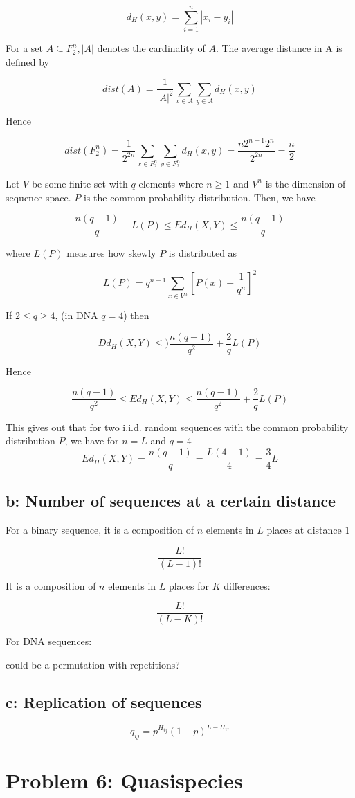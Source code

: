 \[  d_H(x,y) = \sum\limits_{i=1}^{n} | x_i -y_i |\]

For a set $A \subseteq  F^{n}_{2}, |A|$ denotes the cardinality of $A$. The average distance in A is defined by 

\begin{equation}
dist(A) = \frac{1}{|A|^2}\sum\limits_{x\in A}\sum\limits_{y\in A} d_H(x,y)
\end{equation}

Hence 

\begin{equation}
dist(F^{n}_{2}) = \frac{1}{2^{2n}}\sum\limits_{x\in F^{n}_{2}}\sum\limits_{y\in F^{n}_{2}} d_H(x,y) = \frac{n2^{n-1}2^n}{2^{2n}} = \frac{n}{2}
\end{equation}

Let $V$ be some finite set with $q$ elements where $n \geq 1$ and $V^n$ is the dimension of sequence space.  $P$ is the common probability distribution. Then, we have

\[  \frac{n(q-1)}{q} - L(P) \leq Ed_H(X,Y) \leq \frac{n(q-1)}{q} \]

where $L(P)$ measures how skewly $P$ is distributed as

\[  L(P) = q^{n-1} \sum\limits_{x \in V^n} \left[P(x)-\frac{1}{q^n}\right]^2 \]

If $ 2\leq q \geq 4$, (in DNA $q=4$) then 

\[  Dd_H(X,Y) \leq )\frac{n(q-1)}{q^2} + \frac{2}{q}L(P) \]

Hence

\[  \frac{n(q-1)}{q^2}  \leq Ed_H(X,Y) \leq \frac{n(q-1)}{q^2} + \frac{2}{q}L(P) \]

This gives out that for two i.i.d. random sequences with the common probability distribution $P$, we have for  $n = L$ and $q = 4$
\begin{equation}
Ed_H(X,Y)  = \frac{n(q-1)}{q} = \frac{L(4-1)}{4} = \frac{3}{4}L
\end{equation}


\subsection{b: Number of sequences at a certain distance}

For a binary sequence, it is a composition of $n$ elements in $L$ places at distance $1$

\[  \frac{L!}{(L-1)!} \]

It is a composition of $n$ elements in $L$ places for $K$ differences:

\[  \frac{L!}{(L-K)!} \]

For DNA sequences:


could be a permutation with repetitions?

\subsection{c: Replication of sequences}
\begin{equation}
q_{ij} = p^{H_{ij}}(1-p)^{L-H_{ij}}
\end{equation}
\setcounter{chapter}{6}
\setcounter{section}{0}
\section{Problem 6: Quasispecies}
